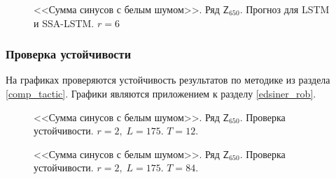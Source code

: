 \documentclass[specialist,
               substylefile = spbu.rtx,
               subf,href,colorlinks=true, 12p]{disser}
\begin{document}
\begin{figure}[H]
	\captionsetup{justification=centering}
	\caption{<<Сумма синусов с белым шумом>>. Ряд $\mathsf{Z}_{650}$. Прогноз для LSTM и SSA-LSTM. $r = 6$}
	\label{edsinr_r6_res_lstm}
\end{figure}

\subsubsection{Проверка устойчивости}
\label{aedsiner_rob}
На графиках проверяются устойчивость результатов по методике из раздела \ref{comp_tactic}. Графики являются приложением к разделу \ref{edsiner_rob}.


\begin{figure}[h]
	\captionsetup{justification=centering}
	\caption{<<Сумма синусов с белым шумом>>. Ряд $\mathsf{Z}_{650}$. Проверка устойчивости. $r = 2, \; L = 175$. $T = 12$.}
	\label{edsiner2.12}
\end{figure}

\begin{figure}[h]
	\captionsetup{justification=centering}
	\caption{<<Сумма синусов с белым шумом>>. Ряд $\mathsf{Z}_{650}$. Проверка устойчивости. $r = 2, \; L = 175$. $T = 84$.}
\end{figure}
\end{document}
